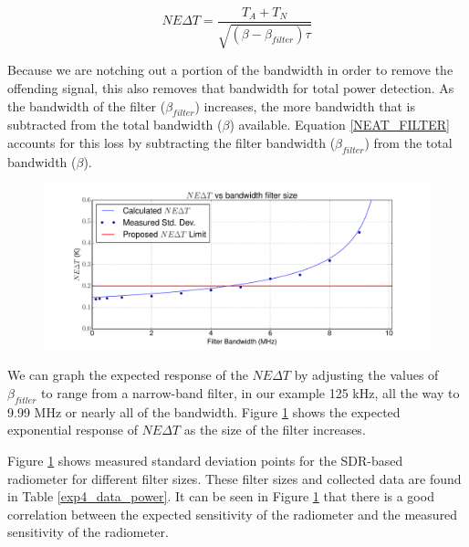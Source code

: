 \begin{equation}\label{NEAT_FILTER}
NE\Delta T=\frac{T_{A}+T_{N}}{\sqrt{(\beta - \beta_{filter})  \tau}}
\end{equation}

Because we are notching out a portion of the bandwidth in order to remove the offending signal, this also removes that bandwidth for total power detection.  As the bandwidth of the filter ($\beta_{filter}$) increases, the more bandwidth that is subtracted from the total bandwidth ($\beta$) available.  Equation \ref{NEAT_FILTER} accounts for this loss by subtracting the filter bandwidth ($\beta_{filter}$) from the total bandwidth ($\beta$).  

\begin{figure}[h!tb] \centering
\includegraphics[width=\textwidth]{Experiments/Exp5/neatvsbw_plot.pdf}
\label{neat_bw}
\end{figure}

We can graph the expected response of the $NE\Delta T$ by adjusting the values of $\beta_{fitler}$ to range from a narrow-band filter, in our example 125 kHz, all the way to 9.99 MHz or nearly all of the bandwidth.  Figure \ref{neat_bw} shows the expected exponential response of $NE\Delta T$ as the size of the filter increases.  

Figure \ref{neat_bw} shows measured standard deviation points for the SDR-based radiometer for different filter sizes.  These filter sizes and collected data are found in Table \ref{exp4_data_power}.  It can be seen in Figure \ref{neat_bw} that there is a good correlation between the expected sensitivity of the radiometer and the measured sensitivity of the radiometer.

